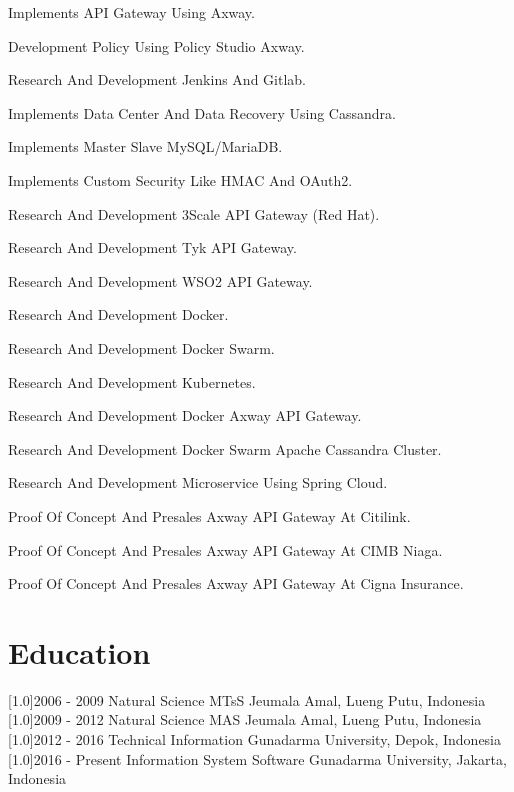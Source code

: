 \documentclass[english]{cv-style}
\begin{document}
\begin{entrylist}
{\begin{itemize}
{    \item Implements API Gateway Using Axway.
    \item Development Policy Using Policy Studio Axway.
    \item Research And Development Jenkins And Gitlab.
    \item Implements Data Center And Data Recovery Using Cassandra.
    \item Implements Master Slave MySQL/MariaDB.
    \item Implements Custom Security Like HMAC And OAuth2.
    \item Research And Development 3Scale API Gateway (Red Hat).
    \item Research And Development Tyk API Gateway.
    \item Research And Development WSO2 API Gateway.
    \item Research And Development Docker.
    \item Research And Development Docker Swarm.
    \item Research And Development Kubernetes.
    \item Research And Development Docker Axway API Gateway.
    \item Research And Development Docker Swarm Apache Cassandra Cluster.
    \item Research And Development Microservice Using Spring Cloud.
    \item Proof Of Concept And Presales Axway API Gateway At Citilink.
    \item Proof Of Concept And Presales Axway API Gateway At CIMB Niaga.
    \item Proof Of Concept And Presales Axway API Gateway At Cigna Insurance.}
  \end{itemize}}
\end{entrylist}
\section{Education}
  \vspace{-0.3cm}
\begin{entrylist}
\entry
{\scalebox{.8}[1.0]{2006 - 2009}}
{Natural Science}
{MTsS Jeumala Amal, Lueng Putu, Indonesia}
{}
\entry
{\scalebox{.8}[1.0]{2009 - 2012}}
{Natural Science}
{MAS Jeumala Amal, Lueng Putu, Indonesia}
{}
\entry
{\scalebox{.8}[1.0]{2012 - 2016}}
{Technical Information}
{Gunadarma University, Depok, Indonesia}
{}
\entry
{\scalebox{.8}[1.0]{2016 - Present}}
{Information System Software}
{Gunadarma University, Jakarta, Indonesia}
{}
\end{entrylist}
\vspace{-0.3cm}
\end{document}
